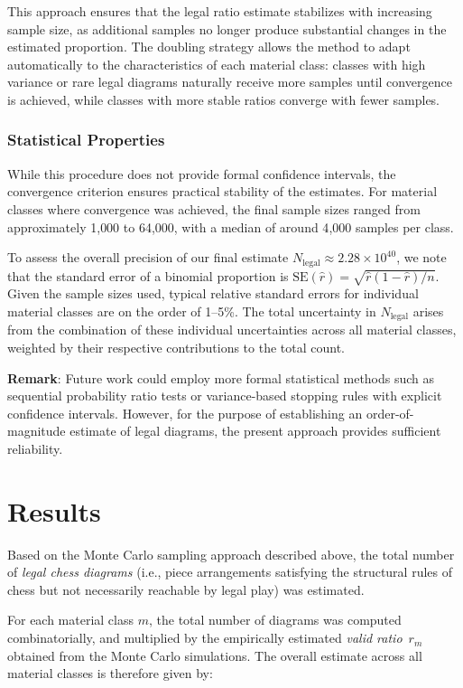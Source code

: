 \documentclass[12pt]{article}
\begin{document}
This approach ensures that the legal ratio estimate stabilizes with increasing sample size, as additional samples no longer produce substantial changes in the estimated proportion. The doubling strategy allows the method to adapt automatically to the characteristics of each material class: classes with high variance or rare legal diagrams naturally receive more samples until convergence is achieved, while classes with more stable ratios converge with fewer samples.

\subsubsection{Statistical Properties}

While this procedure does not provide formal confidence intervals, the convergence criterion ensures practical stability of the estimates. For material classes where convergence was achieved, the final sample sizes ranged from approximately 1{,}000 to 64{,}000, with a median of around 4{,}000 samples per class.

To assess the overall precision of our final estimate $N_{\text{legal}} \approx 2.28 \times 10^{40}$, we note that the standard error of a binomial proportion is $\text{SE}(\hat{r}) = \sqrt{\hat{r}(1-\hat{r})/n}$. Given the sample sizes used, typical relative standard errors for individual material classes are on the order of 1--5\%. The total uncertainty in $N_{\text{legal}}$ arises from the combination of these individual uncertainties across all material classes, weighted by their respective contributions to the total count.

\textbf{Remark}: Future work could employ more formal statistical methods such as sequential probability ratio tests or variance-based stopping rules with explicit confidence intervals. However, for the purpose of establishing an order-of-magnitude estimate of legal diagrams, the present approach provides sufficient reliability.

\section{Results}

Based on the Monte Carlo sampling approach described above, the total number of \emph{legal chess diagrams} (i.e., piece arrangements satisfying the structural rules of chess but not necessarily reachable by legal play) was estimated.

For each material class $m$, the total number of diagrams was computed combinatorially, and multiplied by the empirically estimated \emph{valid ratio}~$r_m$ obtained from the Monte Carlo simulations.  
The overall estimate across all material classes is therefore given by:
\end{document}
